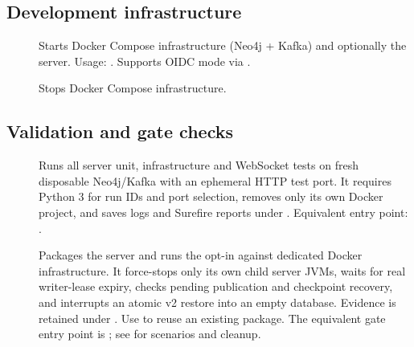 \subsection{Development infrastructure}

\begin{description}
\item[]
  Starts Docker Compose infrastructure (Neo4j + Kafka) and optionally the
  server. Usage: .
  Supports OIDC mode via .

\item[]
  Stops Docker Compose infrastructure.
\end{description}

\subsection{Validation and gate checks}

\begin{description}
\item[]
  Runs all server unit, infrastructure and WebSocket tests on fresh disposable
  Neo4j/Kafka with an ephemeral HTTP test port. It requires Python 3 for run IDs
  and port selection, removes only its own Docker project, and saves logs and
  Surefire reports under .
  Equivalent entry point: .
\item[]
  Packages the server and runs the opt-in  against
  dedicated Docker infrastructure. It force-stops only its own child server
  JVMs, waits for real writer-lease expiry, checks pending publication and
  checkpoint recovery, and interrupts an atomic v2 restore into an empty
  database. Evidence is retained under .
  Use  to reuse an existing package. The equivalent gate
  entry point is ; see
   for scenarios and cleanup.
\end{description}

